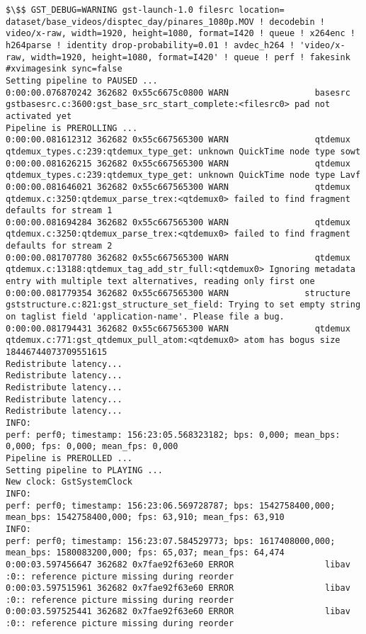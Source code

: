 \documentclass[12pt,oneside]{book}
\begin{document}
\begin{lstlisting}
$\$$ GST_DEBUG=WARNING gst-launch-1.0 filesrc location= dataset/base_videos/disptec_day/pinares_1080p.MOV ! decodebin ! video/x-raw, width=1920, height=1080, format=I420 ! queue ! x264enc ! h264parse ! identity drop-probability=0.01 ! avdec_h264 ! 'video/x-raw, width=1920, height=1080, format=I420' ! queue ! perf ! fakesink #xvimagesink sync=false
Setting pipeline to PAUSED ...
0:00:00.076870242 362682 0x55c6675c0800 WARN                 basesrc gstbasesrc.c:3600:gst_base_src_start_complete:<filesrc0> pad not activated yet
Pipeline is PREROLLING ...
0:00:00.081612312 362682 0x55c667565300 WARN                 qtdemux qtdemux_types.c:239:qtdemux_type_get: unknown QuickTime node type sowt
0:00:00.081626215 362682 0x55c667565300 WARN                 qtdemux qtdemux_types.c:239:qtdemux_type_get: unknown QuickTime node type Lavf
0:00:00.081646021 362682 0x55c667565300 WARN                 qtdemux qtdemux.c:3250:qtdemux_parse_trex:<qtdemux0> failed to find fragment defaults for stream 1
0:00:00.081694284 362682 0x55c667565300 WARN                 qtdemux qtdemux.c:3250:qtdemux_parse_trex:<qtdemux0> failed to find fragment defaults for stream 2
0:00:00.081707780 362682 0x55c667565300 WARN                 qtdemux qtdemux.c:13188:qtdemux_tag_add_str_full:<qtdemux0> Ignoring metadata entry with multiple text alternatives, reading only first one
0:00:00.081779354 362682 0x55c667565300 WARN               structure gststructure.c:821:gst_structure_set_field: Trying to set empty string on taglist field 'application-name'. Please file a bug.
0:00:00.081794431 362682 0x55c667565300 WARN                 qtdemux qtdemux.c:771:gst_qtdemux_pull_atom:<qtdemux0> atom has bogus size 18446744073709551615
Redistribute latency...
Redistribute latency...
Redistribute latency...
Redistribute latency...
Redistribute latency...
INFO:
perf: perf0; timestamp: 156:23:05.568323182; bps: 0,000; mean_bps: 0,000; fps: 0,000; mean_fps: 0,000
Pipeline is PREROLLED ...
Setting pipeline to PLAYING ...
New clock: GstSystemClock
INFO:
perf: perf0; timestamp: 156:23:06.569728787; bps: 1542758400,000; mean_bps: 1542758400,000; fps: 63,910; mean_fps: 63,910
INFO:
perf: perf0; timestamp: 156:23:07.584529773; bps: 1617408000,000; mean_bps: 1580083200,000; fps: 65,037; mean_fps: 64,474
0:00:03.597456647 362682 0x7fae92f63e60 ERROR                  libav :0:: reference picture missing during reorder
0:00:03.597515961 362682 0x7fae92f63e60 ERROR                  libav :0:: reference picture missing during reorder
0:00:03.597525441 362682 0x7fae92f63e60 ERROR                  libav :0:: reference picture missing during reorder

\end{lstlisting}
\end{document}

